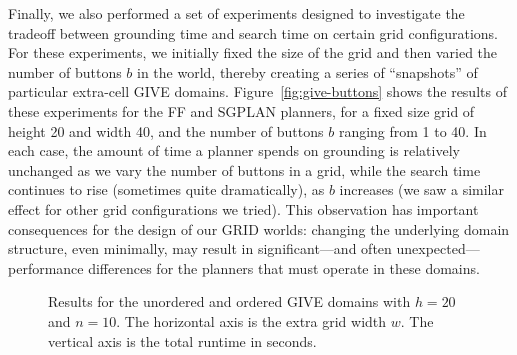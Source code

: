 Finally, we also performed a set of experiments designed to investigate the
tradeoff between grounding time and search time on certain grid configurations.
For these experiments, we initially fixed the size of the grid and then varied
the number of buttons $b$ in the world, thereby creating a series of
``snapshots'' of particular extra-cell GIVE domains.
Figure~\ref{fig:give-buttons} shows the results of these experiments for the FF
and SGPLAN planners, for a fixed size grid of height 20 and width 40, and the
number of buttons $b$ ranging from 1 to 40. In each case, the amount of time a
planner spends on grounding is relatively unchanged as we vary the number of
buttons in a grid, while the search time continues to rise (sometimes quite
dramatically), as $b$ increases (we saw a similar effect for other grid
configurations we tried). This observation has important consequences for the
design of our GRID worlds: changing the underlying domain structure, even
minimally, may result in significant---and often unexpected---performance
differences for the planners that must operate in these domains.



\begin{figure}[t]
  \caption{Results for the unordered and ordered GIVE domains with $h = 20$ and
  $n = 10$. The horizontal axis is the extra grid width $w$.
  The vertical axis is the total runtime in seconds.}
  \label{fig:give-extracells}
\end{figure}


